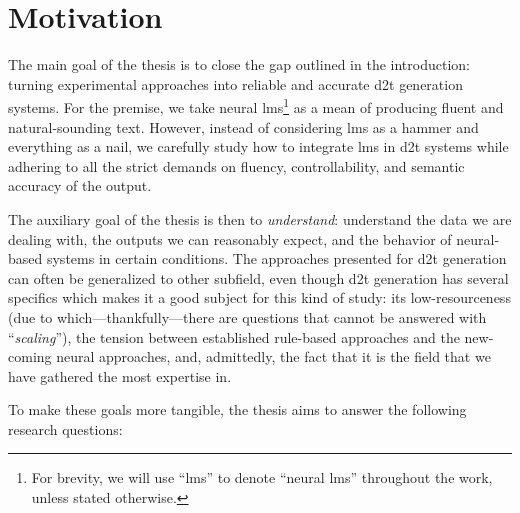 \section{Motivation}
\label{sec:rq}

The main goal of the thesis is to close the gap outlined in the introduction: turning experimental approaches into reliable and accurate \ac{d2t} generation systems. For the premise, we take neural \acp{lm}\footnote{For brevity, we will use ``\acp{lm}'' to denote ``neural \acp{lm}'' throughout the work, unless stated otherwise.} as a mean of producing fluent and natural-sounding text. However, instead of considering \acp{lm} as a hammer and everything as a nail, we carefully study how to integrate \acp{lm} in \ac{d2t} systems while adhering to all the strict demands on fluency, controllability, and semantic accuracy of the output.

The auxiliary goal of the thesis is then to \textit{understand}: understand the data we are dealing with, the outputs we can reasonably expect, and the behavior of neural-based systems in certain conditions. The approaches presented for \ac{d2t} generation can often be generalized to other subfield, even though \ac{d2t} generation has several specifics which makes it a good subject for this kind of study: its low-resourceness (due to which---thankfully---there are questions that cannot be answered with ``\emph{scaling}''), the tension between established rule-based approaches and the new-coming neural approaches, and, admittedly, the fact that it is the field that we have gathered the most expertise in.

To make these goals more tangible, the thesis aims to answer the following research questions:

